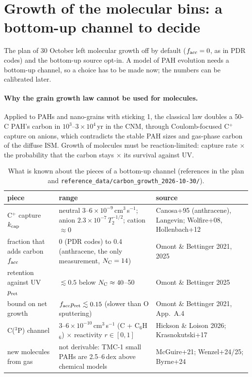 \documentclass[11pt,a4paper]{article}
\newcommand{\NC}{N_{\rm C}}
\begin{document}
\section{Growth of the molecular bins: a bottom-up channel to decide}\label{sec:growth}

The plan of 30 October left molecular growth off by default ($f_{\rm acc} = 0$, as in PDR codes) and the bottom-up
source opt-in. A model of PAH evolution needs a bottom-up channel, so a choice has to be made now; the numbers can be
calibrated later.

\paragraph{Why the grain growth law cannot be used for molecules.} Applied to PAHs and nano-grains with sticking 1,
the classical law doubles a 50-C PAH's carbon in $10^3$--$3\times10^4$\,yr in the CNM, through Coulomb-focused
C$^+$ capture on anions, which contradicts the stable PAH sizes and gas-phase carbon of the diffuse ISM. Growth of
molecules must be reaction-limited: capture rate $\times$ the probability that the carbon stays $\times$ its survival
against UV.

\begin{table}[H]
\centering\small
\caption{What is known about the pieces of a bottom-up channel (references in the plan and
\texttt{reference\_data/carbon\_growth\_2026-10-30/}).}\label{tab:growthparams}
\begin{tabularx}{\textwidth}{@{}l L L@{}}
\toprule
piece & range & source \\
\midrule
C$^+$ capture $k_{\rm cap}$ & neutral $3$--$6\times10^{-9}$\,cm$^3$\,s$^{-1}$; anion $2.3\times10^{-7}\,T_2^{-1/2}$; cation $\approx0$ & Canosa+95 (anthracene), Langevin; Wolfire+08, Hollenbach+12 \\
fraction that adds carbon $f_{\rm acc}$ & 0 (PDR codes) to 0.4 (anthracene, the only measurement, $\NC = 14$) & Omont \& Bettinger 2021, 2025 \\
retention against UV $p_{\rm ret}$ & $\lesssim0.5$ below $\NC\approx40$--50 & Omont \& Bettinger 2025 \\
bound on net growth & $f_{\rm acc}p_{\rm ret}\lesssim0.15$ (slower than O sputtering) & Omont \& Bettinger 2021, App.~A.4 \\
C($^3$P) channel & $3$--$6\times10^{-10}$\,cm$^3$\,s$^{-1}$ (C + C$_6$H$_6$) $\times$ reactivity $r\in[0,1]$ & Hickson \& Loison 2026; Krasnokutski+17 \\
new molecules from gas & not derivable: TMC-1 small PAHs are 2.5--6\,dex above chemical models & McGuire+21; Wenzel+24/25; Byrne+24 \\
\bottomrule
\end{tabularx}
\end{table}
\end{document}
